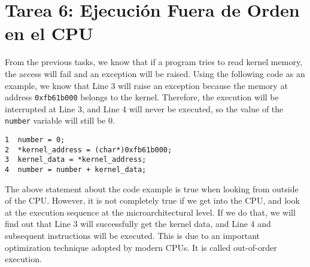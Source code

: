 

%
%
%
%







\section{Tarea 6: Ejecución Fuera de Orden en el CPU}


From the previous tasks, we know that if a program tries to read 
kernel memory, the access will fail and an exception will be raised. 
Using the following code as an example, we know that 
Line 3 will raise an exception because the memory at address \texttt{0xfb61b000}
belongs to the kernel. Therefore, the execution will be interrupted at Line 3, and 
Line 4 will never be executed, so the value of 
the \texttt{number} variable will still be 0.

\begin{lstlisting}
1  number = 0;
2  *kernel_address = (char*)0xfb61b000;
3  kernel_data = *kernel_address;
4  number = number + kernel_data;
\end{lstlisting}

The above statement about the code example is true when looking from outside of the CPU. 
However, it is not completely true if we get into the CPU, and look at the execution sequence
at the microarchitectural level. If we do that, we will find out that 
Line 3 will successfully get the kernel data, and Line 4 and subsequent instructions 
will be executed. This is due to an important optimization technique adopted by
modern CPUs. It is called out-of-order execution. 


